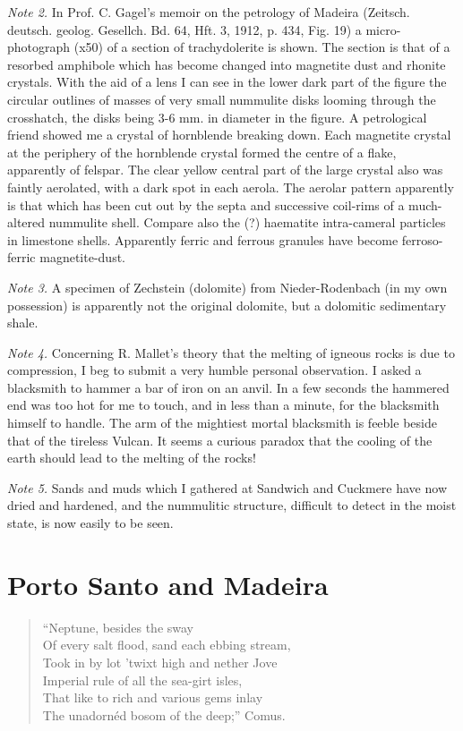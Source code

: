 \documentclass[a4paper, 12pt, oneside]{article}
\begin{document}
\emph{Note 2.} In Prof. C. Gagel's memoir on the petrology of Madeira (Zeitsch. deutsch. geolog. Gesellch. Bd. 64, Hft. 3, 1912, p. 434, Fig. 19) a micro-photograph (x50) of a section of trachydolerite is shown. The section is that of a resorbed amphibole which has become changed into magnetite dust and rhonite crystals. With the aid of a lens I can see in the lower dark part of the figure the circular outlines of masses of very small nummulite disks looming through the crosshatch, the disks being 3-6 mm. in diameter in the figure. A petrological friend showed me a crystal of hornblende breaking down. Each magnetite crystal at the periphery of the hornblende crystal formed the centre of a flake, apparently of felspar. The clear yellow central part of the large crystal also was faintly aerolated, with a dark spot in each aerola. The aerolar pattern apparently is that which has been cut out by the septa and successive coil-rims of a much-altered nummulite shell. Compare also the (?) haematite intra-cameral particles in limestone shells. Apparently ferric and ferrous granules have become ferroso-ferric magnetite-dust.

\emph{Note 3.} A specimen of Zechstein (dolomite) from Nieder-Rodenbach (in my own possession) is apparently not the original dolomite, but a dolomitic sedimentary shale.

\emph{Note 4.} Concerning R. Mallet's theory that the melting of igneous rocks is due to compression, I beg to submit a very humble personal observation. I asked a blacksmith to hammer a bar of iron on an anvil. In a few seconds the hammered end was too hot for me to touch, and in less than a minute, for the blacksmith himself to handle. The arm of the mightiest mortal blacksmith is feeble beside that of the tireless Vulcan. It seems a curious paradox that the cooling of the earth should lead to the melting of the rocks!

\emph{Note 5.} Sands and muds which I gathered at Sandwich and Cuckmere have now dried and hardened, and the nummulitic structure, difficult to detect in the moist state, is now easily to be seen.
\normalsize
\clearpage
\section{Porto Santo and Madeira}
\Large
\begin{quote} 
\hspace*{15mm}``Neptune, besides the sway\\
Of every salt flood, sand each ebbing stream,\\
Took in by lot 'twixt high and nether Jove\\
Imperial rule of all the sea-girt isles,\\
That like to rich and various gems inlay\\
The unadornéd bosom of the deep;'' \hspace*{5mm}Comus.
\end{quote}
\end{document}
